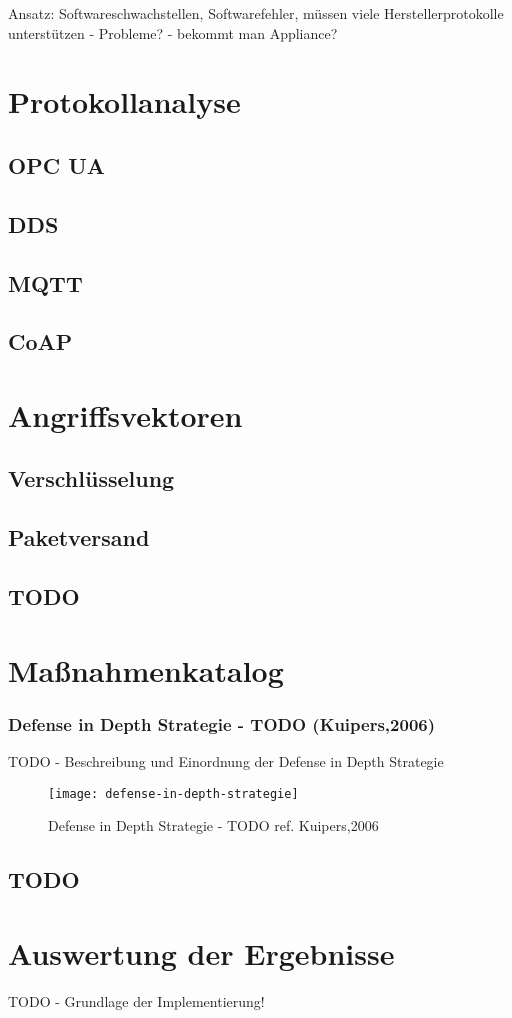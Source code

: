 Ansatz: Softwareschwachstellen, Softwarefehler, müssen viele Herstellerprotokolle unterstützen - Probleme? - bekommt man Appliance?

\section{Protokollanalyse}
\subsection{OPC UA}
\subsection{DDS}
\subsection{MQTT}
\subsection{CoAP}

\section{Angriffsvektoren}
\subsection{Verschlüsselung}
\subsection{Paketversand}
\subsection{TODO}

\section{Maßnahmenkatalog}
\subsubsection{Defense in Depth Strategie - TODO (Kuipers,2006)}
TODO - Beschreibung und Einordnung der Defense in Depth Strategie

\begin{figure}[h]
    \centering
    \texttt{[image: defense-in-depth-strategie]}
    \caption{Defense in Depth Strategie - TODO ref. Kuipers,2006}
    \label{Kap3:Defense-in-Depth}
\end{figure}

\subsection{TODO}

\section{Auswertung der Ergebnisse}
TODO - Grundlage der Implementierung!